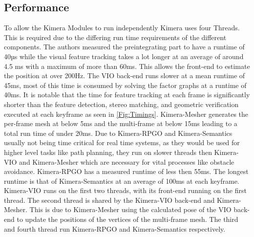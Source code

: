 \documentclass[11pt,a4paper]{article}
\begin{document}
\subsection{Performance}
To allow the Kimera Modules to run independently Kimera uses four Threads. 
This is required due to the differing run time requirements of the different components.
The authors measured the preintegrating part to have a runtime of 40µs while the visual feature tracking takes a lot longer at an average of around 4.5 ms with a maximum of more than 60ms.
This allows the front-end to estimate the position at over 200Hz.
The VIO back-end runs slower at a mean runtime of 45ms, most of this time is consumed by solving the factor graphs at a runtime of 40ms. 
It is notable that the time for feature tracking at each frame is significantly shorter than the feature detection, stereo matching,
and geometric verification executed at each keyframe as seen in \ref{Fig:Timings}.
Kimera-Mesher generates the per-frame mesh at below 5ms and the multi-frame at below 15ms leading to a total run time of under 20ms.
Due to Kimera-RPGO and Kimera-Semantics usually not being time critical for real time systems, as they would be used for higher level tasks like path planning, they run on slower threads then Kimera-VIO and Kimera-Mesher which are necessary for vital processes like obstacle avoidance.
Kimera-RPGO has a measured runtime of less then 55ms.
The longest runtime is that of Kimera-Semantics at an average of 100ms at each keyframe. 
Kimera-VIO runs on the first two threads, with its front-end running on the first thread.
The second thread is shared by the Kimera-VIO back-end and Kimera-Mesher.
This is due to Kimera-Mesher using the calculated pose of the VIO back-end to update the positions of the vertices of the multi-frame mesh.
The third and fourth thread run Kimera-RPGO and Kimera-Semantics respectively. 
\end{document}

